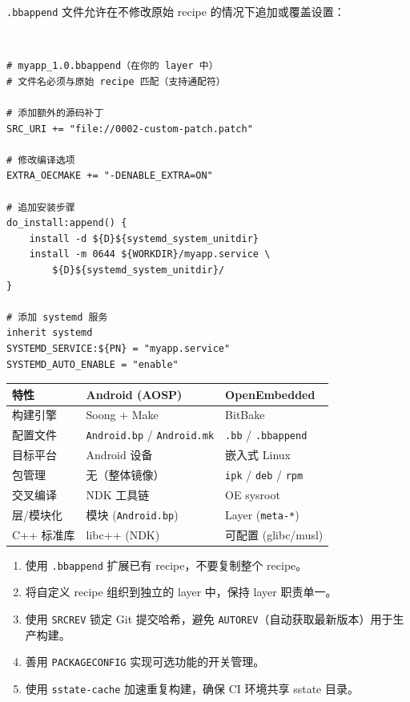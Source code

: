 \documentclass[12pt,a4paper,fontset=fandol]{ctexbook}
\newcommand{\Tp}[1]{\texttt{#1}}
\newcommand{\oelabel}{%
  \noindent\begin{tcolorbox}[sharp corners,colback=oeheadbg,colframe=oeheadbg,
    left=6pt,right=6pt,top=2pt,bottom=2pt,boxrule=0pt]
  \textcolor{white}{\small\bfseries\sffamily OpenEmbedded / BitBake}\end{tcolorbox}%
}
\begin{document}
\Tp{.bbappend} 文件允许在不修改原始 recipe 的情况下追加或覆盖设置：

\oelabel
\begin{lstlisting}[style=bbstyle]
# myapp_1.0.bbappend（在你的 layer 中）
# 文件名必须与原始 recipe 匹配（支持通配符）

# 添加额外的源码补丁
SRC_URI += "file://0002-custom-patch.patch"

# 修改编译选项
EXTRA_OECMAKE += "-DENABLE_EXTRA=ON"

# 追加安装步骤
do_install:append() {
    install -d ${D}${systemd_system_unitdir}
    install -m 0644 ${WORKDIR}/myapp.service \
        ${D}${systemd_system_unitdir}/
}

# 添加 systemd 服务
inherit systemd
SYSTEMD_SERVICE:${PN} = "myapp.service"
SYSTEMD_AUTO_ENABLE = "enable"
\end{lstlisting}

\begin{compare}[title=Android 构建 vs OpenEmbedded]
\begin{tabularx}{\textwidth}{lXX}
\toprule
\textbf{特性} & \textbf{Android (AOSP)} & \textbf{OpenEmbedded} \\
\midrule
构建引擎 & Soong + Make & BitBake \\
配置文件 & \Tp{Android.bp} / \Tp{Android.mk} & \Tp{.bb} / \Tp{.bbappend} \\
目标平台 & Android 设备 & 嵌入式 Linux \\
包管理 & 无（整体镜像） & \Tp{ipk} / \Tp{deb} / \Tp{rpm} \\
交叉编译 & NDK 工具链 & OE sysroot \\
层/模块化 & 模块 (\Tp{Android.bp}) & Layer (\Tp{meta-*}) \\
C++ 标准库 & libc++ (NDK) & 可配置 (glibc/musl) \\
\bottomrule
\end{tabularx}
\end{compare}

\begin{bestpractice}[title=OpenEmbedded 最佳实践]
\begin{enumerate}
  \item 使用 \Tp{.bbappend} 扩展已有 recipe，不要复制整个 recipe。
  \item 将自定义 recipe 组织到独立的 layer 中，保持 layer 职责单一。
  \item 使用 \Tp{SRCREV} 锁定 Git 提交哈希，避免 \Tp{AUTOREV}（自动获取最新版本）用于生产构建。
  \item 善用 \Tp{PACKAGECONFIG} 实现可选功能的开关管理。
  \item 使用 \Tp{sstate-cache} 加速重复构建，确保 CI 环境共享 sstate 目录。
\end{enumerate}
\end{bestpractice}
\end{document}

